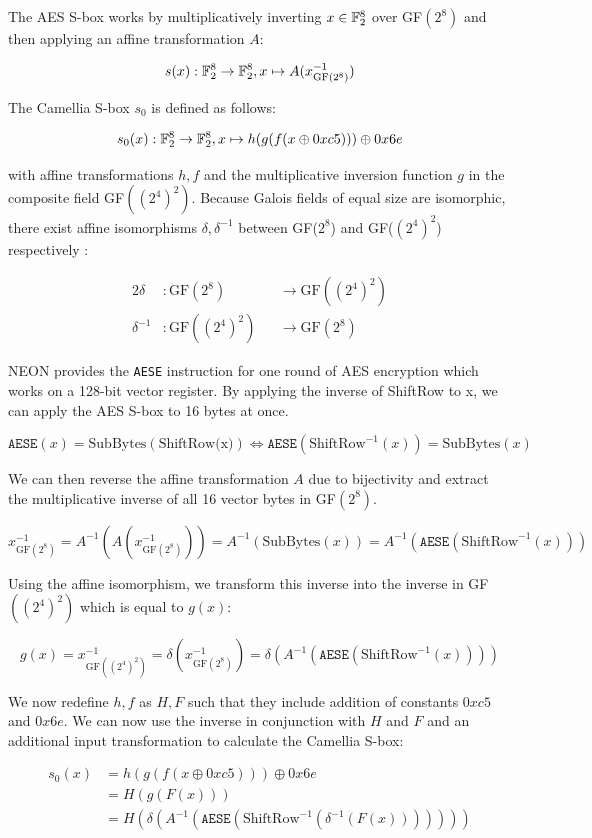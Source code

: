 The AES S-box works by multiplicatively inverting $x\in\mathbb{F}_2^{8}$ over GF$(2^8)$ and then
applying an affine transformation $A$:

\[
    s(x):\mathbb{F}_2^{8}\rightarrow\mathbb{F}_2^{8}, x\mapsto A(x^{-1}_{\text{GF}(2^8)})
\]

The Camellia S-box $s_0$ is defined as follows:

\[
    s_0(x):\mathbb{F}_2^{8}\rightarrow\mathbb{F}_2^{8}, x\mapsto h(g(f(x\oplus 0xc5)))\oplus 0x6e
\]

with affine transformations $h,f$ and the multiplicative inversion function $g$
in the composite field GF$((2^4)^2)$. Because Galois fields of equal size are
isomorphic, there exist affine isomorphisms $\delta,\delta^{-1}$ between
GF($2^8$) and GF($(2^4)^2$) respectively \cite{satohmorioka:2003}:

\begin{alignat*}{2}
    \delta&:\text{GF}(2^8)&&\rightarrow\text{GF}((2^4)^2) \\
    \delta^{-1}&:\text{GF}((2^4)^2)&&\rightarrow\text{GF}(2^8)
\end{alignat*}

NEON provides the \texttt{AESE} instruction for one round of AES encryption
which works on a 128-bit vector register. By applying the inverse of ShiftRow
to x, we can apply the AES S-box to 16 bytes at once.

\[
    \texttt{AESE}(x)=\text{SubBytes}(\text{ShiftRow(x)})\Leftrightarrow \texttt{AESE}(\text{ShiftRow}^{-1}(x))=\text{SubBytes}(x)
\]

We can then reverse the affine transformation $A$ due to bijectivity and
extract the multiplicative inverse of all 16 vector bytes in GF$(2^8)$.

\[
    x^{-1}_{\text{GF}(2^8)}=A^{-1}(A(x^{-1}_{\text{GF}(2^8)}))=A^{-1}(\text{SubBytes}(x))=A^{-1}(\texttt{AESE}(\text{ShiftRow}^{-1}(x)))
\]

Using the affine isomorphism, we transform this inverse into the inverse in
GF$((2^4)^2)$ which is equal to $g(x)$:

\[
    g(x)=x^{-1}_{\text{GF}((2^4)^2)}=\delta(x^{-1}_{\text{GF}(2^8)})=\delta(A^{-1}(\texttt{AESE}(\text{ShiftRow}^{-1}(x))))
\]

We now redefine $h,f$ as $H,F$ such that they include addition of constants
$0xc5$ and $0x6e$. We can now use the inverse in conjunction with $H$ and $F$
and an additional input transformation to calculate the Camellia S-box:

\begin{align*}
    s_0(x)&=h(g(f(x\oplus 0xc5)))\oplus 0x6e \\
          &=H(g(F(x))) \\
          &=H(\delta(A^{-1}(\texttt{AESE}(\text{ShiftRow}^{-1}(\delta^{-1}(F(x)))))))
\end{align*}

